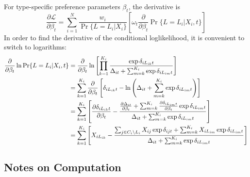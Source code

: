 \documentclass[12pt]{article}
\begin{document}
For type-specific preference parameters $\beta_t$, the derivative is
\begin{equation}
\frac{\partial\mathcal{L}}{\partial{\beta_t}}
= 	\sum_{i=1}^N\frac{w_i}{\Pr\{L=L_i|X_i\}}
\left[
\omega_t\frac{\partial}{\partial{\beta_t}}\Pr\{L=L_i|X_i,t\}
\right]\label{eq:dlogl beta}
\end{equation}
In order to find the derivative of the conditional loglikelihood, it is convenient to switch to logarithms:
\begin{align}
	\frac{\partial}{\partial{\beta_t}}\ln\Pr\{L=L_i|X_i,t\}
		&=	\frac{\partial}{\partial{\beta_t}}\ln
			\left[
				\prod_{k=1}^{K_i}\frac{\exp{\delta_{iL_{ik}t}}}{\Delta_{it} + \sum_{m=k}^{K_i}\exp{\delta_{iL_{im}t}}}
			\right]\notag\\
		&=	\sum_{k=1}^{K_i}\frac{\partial}{\partial{\beta_t}}
			\left[\delta_{iL_{ik}t} - \ln\left(\Delta_{it} + \sum_{m=k}^{K_i}\exp{\delta_{iL_{im}t}}\right)
			\right]\notag\\
		&=	\sum_{k=1}^{K_i}\left[\frac{\partial\delta_{iL_{ik}t}}{\partial{\beta_t}} 
				- \frac{
						\frac{\partial\Delta_{it}}{\partial\beta_t}
						+ \sum_{m=k}^{K_i}\frac{\partial\delta_{iL_{im}t}}{\partial{\beta_t}}
							\exp{\delta_{iL_{im}t}}
					}{
						\Delta_{it} + \sum_{m=k}^{K_i}\exp{\delta_{iL_{im}t}}
					}
			\right]\notag\\
		&=	\sum_{k=1}^{K_i}\left[
				X_{iL_{ik}} 
				- \frac{
					\sum_{j\in{C_i\setminus{L_i}}}X_{ij}\exp{\delta_{ijt}}
					+ \sum_{m=k}^{K_i}X_{iL_{im}}\exp{\delta_{iL_{im}t}}
				}{
					\Delta_{it} + \sum_{m=k}^{K_i}\exp{\delta_{iL_{im}t}}
				}
			\right]\label{eq:cond dlogl}
\end{align}

\subsection{Notes on Computation}
\end{document}
